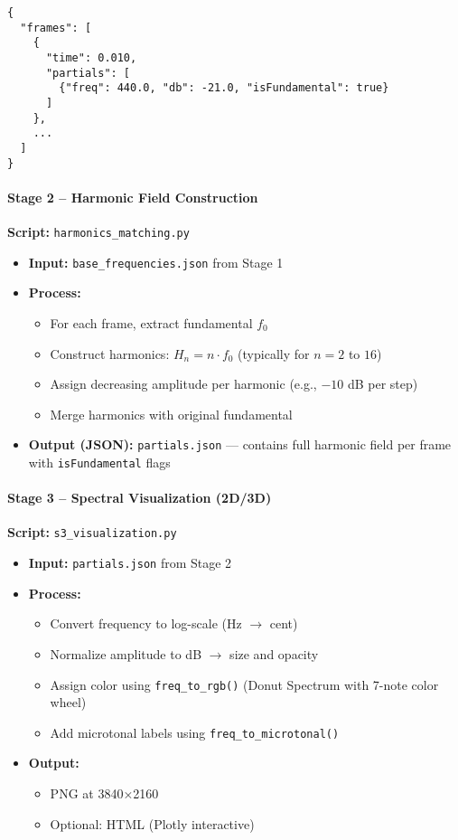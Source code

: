 \begin{verbatim}
{
  "frames": [
    {
      "time": 0.010,
      "partials": [
        {"freq": 440.0, "db": -21.0, "isFundamental": true}
      ]
    },
    ...
  ]
}
\end{verbatim}

\paragraph{Stage 2 – Harmonic Field Construction}  
\textbf{Script:} \texttt{harmonics\_matching.py}

\begin{itemize}
    \item \textbf{Input:} \texttt{base\_frequencies.json} from Stage 1
    \item \textbf{Process:}
    \begin{itemize}
        \item For each frame, extract fundamental $f_0$
        \item Construct harmonics: $H_n = n \cdot f_0$ (typically for $n = 2$ to $16$)
        \item Assign decreasing amplitude per harmonic (e.g., $-10$ dB per step)
        \item Merge harmonics with original fundamental
    \end{itemize}
    \item \textbf{Output (JSON):} \texttt{partials.json} — contains full harmonic field per frame with \texttt{isFundamental} flags
\end{itemize}

\paragraph{Stage 3 – Spectral Visualization (2D/3D)}  
\textbf{Script:} \texttt{s3\_visualization.py}

\begin{itemize}
    \item \textbf{Input:} \texttt{partials.json} from Stage 2
    \item \textbf{Process:}
    \begin{itemize}
        \item Convert frequency to log-scale (Hz $\rightarrow$ cent)
        \item Normalize amplitude to dB $\rightarrow$ size and opacity
        \item Assign color using \texttt{freq\_to\_rgb()} (Donut Spectrum with 7-note color wheel)
        \item Add microtonal labels using \texttt{freq\_to\_microtonal()}
    \end{itemize}
    \item \textbf{Output:}
    \begin{itemize}
        \item PNG at 3840×2160
        \item Optional: HTML (Plotly interactive)
    \end{itemize}
\end{itemize}

